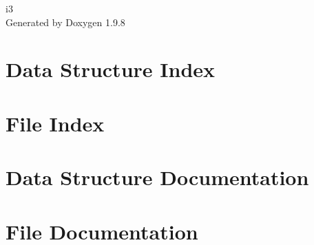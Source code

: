 \documentclass[twoside]{book}
\newcommand{\+}{\discretionary{\mbox{\scriptsize$\hookleftarrow$}}{}{}}
\newcommand{\clearemptydoublepage}{%
    \newpage{\pagestyle{empty}\cleardoublepage}%
  }
\begin{document}
  \raggedbottom
    \hypersetup{pageanchor=false,
                bookmarksnumbered=true,
                pdfencoding=unicode
               }
  \begin{titlepage}
  \vspace*{7cm}
  \begin{center}%
  {\Large i3}\\
  \vspace*{1cm}
  {\large Generated by Doxygen 1.9.8}\\
  \end{center}
  \end{titlepage}
  \clearemptydoublepage
  \tableofcontents
  \clearemptydoublepage
  \hypersetup{pageanchor=true}
\chapter{Data Structure Index}

\chapter{File Index}

\chapter{Data Structure Documentation}










\chapter{File Documentation}










































  \backmatter
  \newpage
  \clearemptydoublepage
  \printindex
\end{document}
